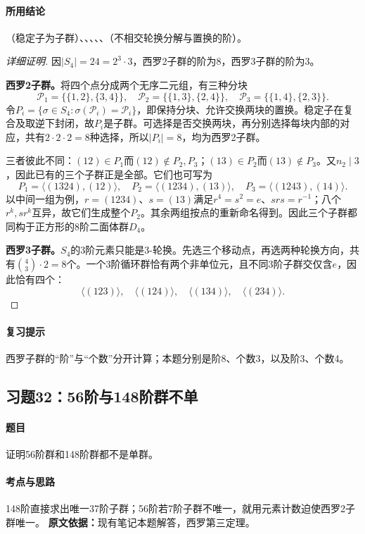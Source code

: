 \paragraph{所用结论}（稳定子为子群）、、、、、（不相交轮换分解与置换的阶）。
\begin{proof}[详细证明]
因$|S_4|=24=2^3\cdot3$，西罗2子群的阶为8，西罗3子群的阶为3。

\textbf{西罗2子群。}将四个点分成两个无序二元组，有三种分块
\[
\mathcal P_1=\{\{1,2\},\{3,4\}\},\quad
\mathcal P_2=\{\{1,3\},\{2,4\}\},\quad
\mathcal P_3=\{\{1,4\},\{2,3\}\}.
\]
令$P_i=\{\sigma\in S_4:\sigma(\mathcal P_i)=\mathcal P_i\}$，即保持分块、允许交换两块的置换。稳定子在复合及取逆下封闭，故$P_i$是子群。可选择是否交换两块，再分别选择每块内部的对应，共有$2\cdot2\cdot2=8$种选择，所以$|P_i|=8$，均为西罗2子群。

三者彼此不同：$(12)\in P_1$而$(12)\notin P_2,P_3$；$(13)\in P_2$而$(13)\notin P_3$。又$n_2\mid3$，因此已有的三个子群正是全部。它们也可写为
\[
P_1=\langle(1324),(12)\rangle,\quad
P_2=\langle(1234),(13)\rangle,\quad
P_3=\langle(1243),(14)\rangle.
\]
以中间一组为例，$r=(1234)$、$s=(13)$满足$r^4=s^2=e$、$srs=r^{-1}$；八个$r^k,sr^k$互异，故它们生成整个$P_2$。其余两组按点的重新命名得到。因此三个子群都同构于正方形的8阶二面体群$D_4$。

\textbf{西罗3子群。}$S_4$的3阶元素只能是3-轮换。先选三个移动点，再选两种轮换方向，共有$\binom43\cdot2=8$个。一个3阶循环群恰有两个非单位元，且不同3阶子群交仅含$e$，因此恰有四个：
\[
\langle(123)\rangle,\quad\langle(124)\rangle,\quad
\langle(134)\rangle,\quad\langle(234)\rangle.
\]
\end{proof}
\paragraph{复习提示}西罗子群的“阶”与“个数”分开计算；本题分别是阶8、个数3，以及阶3、个数4。

\subsection{习题32：56阶与148阶群不单}
\paragraph{题目}证明56阶群和148阶群都不是单群。
\paragraph{考点与思路}148阶直接求出唯一37阶子群；56阶若7阶子群不唯一，就用元素计数迫使西罗2子群唯一。
\textbf{原文依据：}现有笔记本题解答，西罗第三定理。
